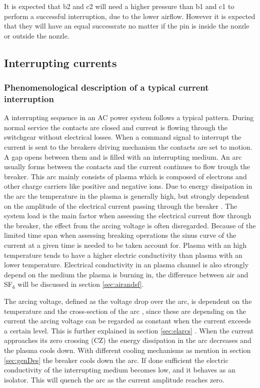 \documentclass[10pt,a4paper]{article} %
\begin{document}
It is expected that b2 and c2 will need a higher pressure than b1 and c1 to perform a successful interruption, due to the lower airflow. However it is expected that they will have an equal successrate no matter if the pin is inside the nozzle or outside the nozzle.
\newpage
\subsection{Interrupting currents} 
\subsubsection{Phenomenological description of a typical current interruption} \label{sec:InterruptCurrent}
A interrupting sequence in an AC power system follows a typical pattern. During normal service the contacts are closed and current is flowing through the switchgear without electrical losses. When a command signal to interrupt the current is sent to the breakers driving mechanism the contacts are set to motion. A gap opens between them and is filled with an interrupting medium. An arc usually forms between the contacts and the current continues to flow trough the breaker. This arc mainly consists of plasma which is composed of electrons and other charge carriers like positive and negative ions. Due to energy dissipation in the arc the temperature in the plasma is generally high, but strongly dependent on the amplitude of the electrical current passing through the breaker \cite{bib:HVEbreak}. The system load is the main factor when assessing the electrical current flow through the breaker, the effect from the arcing voltage is often disregarded. Because of the limited time span when assessing breaking operations the sinus curve of the current at a given time is needed to be taken account for. Plasma with an high temperature tends to have a higher electric conductivity than plasma with an lower temperature. Electrical conductivity in an plasma channel is also strongly depend on the medium the plasma is burning in, the difference between air and SF${_6}$ will be discussed in section \ref{sec:airandsf}.

The arcing voltage, defined as the voltage drop over the arc, is dependent on the temperature and the cross-section of the arc \cite{bib:HVEbreak}, since these are depending on the current the arcing voltage can be regarded as constant when the current exceeds a certain level. This is further explained in section \ref{sec:elarcs} . When the current approaches its zero crossing (CZ) the energy dissipation in the arc decreases and the plasma cools down. With different cooling mechanisms as mention in section \ref{sec:genDes} the breaker cools down the arc. If done sufficient the electric conductivity of the interrupting medium becomes low, and it behaves as an isolator. This will quench the arc as the current amplitude reaches zero.
\end{document}
